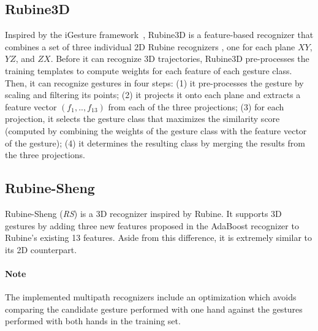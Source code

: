 \subsection{Rubine3D}
Inspired by the iGesture framework~\cite{Signer:2007}, Rubine3D is a feature-based recognizer that combines a set of three individual 2D Rubine recognizers \cite{Rubine:1991}, one for each plane $XY$, $YZ$, and $ZX$. Before it can recognize 3D trajectories, Rubine3D pre-processes the training templates to compute weights for each feature of each gesture class. Then, it can recognize gestures in four steps: (1) it pre-processes the gesture by scaling and filtering its points; (2) it projects it onto each plane and extracts a feature vector $(f_1,..,f_{13})$ from each of the three projections; (3) for each projection, it selects the gesture class that maximizes the similarity score (computed by combining the weights of the gesture class with the feature vector of the gesture); (4) it determines the resulting class by merging the results from the three projections.

\subsection{Rubine-Sheng}
Rubine-Sheng (\textit{RS}) is a 3D recognizer inspired by Rubine. It supports 3D gestures by adding three new features proposed in the AdaBoost recognizer \cite{Sheng:2004} to Rubine's existing 13 features. Aside from this difference, it is extremely similar to its 2D counterpart.
    
\paragraph{Note}
The implemented multipath recognizers include an optimization which avoids comparing the candidate gesture performed with one hand against the gestures performed with both hands in the training set.



